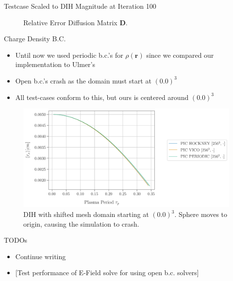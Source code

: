 \begin{frame}[c]{Testcase Scaled to DIH Magnitude at Iteration 100}
\begin{multicols}{2}
\begin{figure}[!htb]
      \caption{Relative Error Diffusion Matrix $\boldsymbol D$.}
      \label{fig:Fd_convergence}
    \end{figure}
    \end{multicols}
\end{frame}

\begin{frame}[c]{Charge Density B.C.}
    \begin{itemize}
        \item Until now we used periodic b.c.'s for $\rho(\boldsymbol r)$ since we compared our implementation to Ulmer's
        \item Open b.c.'s crash as the domain must start at $(0.0)^3$
        \item All test-cases conform to this, but ours is centered around $(0.0)^3$
    \end{itemize}
    
    \begin{figure}[!htb]
        \centering
        \captionsetup{justification=centering}
        \includegraphics[width=0.80\linewidth]{figures/rmeanX.pdf}
      \caption{DIH with shifted mesh domain starting at $(0.0)^3$. Sphere moves to origin, causing the simulation to crash.}
      \label{fig:identity_convergence}
    \end{figure}
\end{frame}

\begin{frame}[t]{TODOs}
    \begin{itemize}
        \item Continue writing
        \item {[Test performance of E-Field solve for using open b.c. solvers]}
    \end{itemize}
\end{frame}


